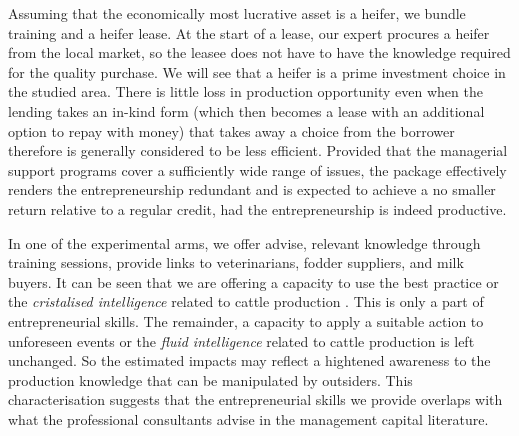 	Assuming that the economically most lucrative asset is a heifer, we bundle training and a heifer lease. At the start of a lease, our expert procures a heifer from the local market, so the leasee does not have to have the knowledge required for the quality purchase. We will see that a heifer is a prime investment choice in the studied area. There is little loss in production opportunity even when the lending takes an in-kind form (which then becomes a lease with an additional option to repay with money) that takes away a choice from the borrower therefore is generally considered to be less efficient. Provided that the managerial support programs cover a sufficiently wide range of issues, the package effectively renders the entrepreneurship redundant and is expected to achieve a no smaller return relative to a regular credit, had the entrepreneurship is indeed productive. 

	In one of the experimental arms, we offer advise, relevant knowledge through training sessions, provide links to veterinarians, fodder suppliers, and milk buyers. It can be seen that we are offering a capacity to use the best practice or the \textit{cristalised intelligence} related to cattle production \citep{Cattell1963}. This is only a part of entrepreneurial skills. The remainder, a capacity to apply a suitable action to unforeseen events or the \textit{fluid intelligence} related to cattle production is left unchanged. So the estimated impacts may reflect a hightened awareness to the production knowledge that can be manipulated by outsiders. This characterisation suggests that the entrepreneurial skills we provide overlaps with what the professional consultants advise in the management capital literature. %

